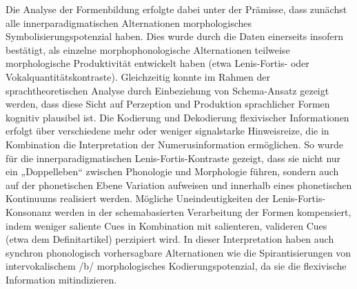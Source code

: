 Die Analyse der Formenbildung erfolgte dabei unter der Prämisse, dass zunächst alle innerparadigmatischen Alternationen morphologisches Symbolisierungspotenzial haben. Dies wurde durch die Daten einerseits insofern bestätigt, als einzelne morphophonologische Alternationen teilweise morphologische Produktivität entwickelt haben (etwa Lenis-Fortis- oder Vokalquantitätskontraste). Gleichzeitig konnte im Rahmen der sprachtheoretischen Analyse durch Einbeziehung von  Schema-Ansatz gezeigt werden, dass diese Sicht auf Perzeption und Produktion sprachlicher Formen kognitiv plausibel ist. Die Kodierung und Dekodierung flexivischer Informationen erfolgt über verschiedene mehr oder weniger signalstarke Hinweisreize, die in Kombination die Interpretation der Numerusinformation ermöglichen. So wurde für die innerparadigmatischen Lenis-Fortis-Kontraste gezeigt, dass sie nicht nur ein „Doppelleben“ \citep{Seiler2008} zwischen Phonologie und Morphologie führen, sondern auch auf der phonetischen Ebene Variation aufweisen und innerhalb eines phonetischen Kontinuums realisiert werden. Mögliche Uneindeutigkeiten der Lenis-Fortis-Konsonanz werden in der schemabasierten Verarbeitung der Formen kompensiert, indem weniger saliente Cues in Kombination mit salienteren, valideren Cues (etwa dem Definitartikel) perzipiert wird. In dieser Interpretation haben auch synchron phonologisch vorhersagbare Alternationen wie die Spirantisierungen von intervokalischem /b/ morphologisches Kodierungspotenzial, da sie die flexivische Information mitindizieren.

